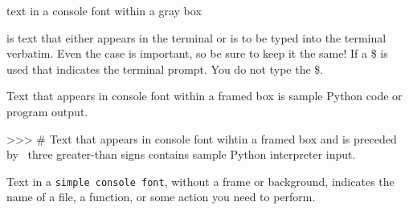 \documentclass[11pt]{cselabheader}
\begin{document}
\begin{bashcode}
text in a console font within a gray box
\end{bashcode}

is text that either appears in the terminal or is to be typed into the terminal
verbatim. Even the case is important, so be sure to keep it the same! If a \$ is
used that indicates the terminal prompt. You do not type the \$.

\begin{python3code}
Text that appears in console font within a framed box is sample Python code
or program output.
\end{python3code}

\begin{pyconcode}
>>> # Text that appears in console font wihtin a framed box and is preceded by \
three greater-than signs contains sample Python interpreter input.
\end{pyconcode}

Text in a \texttt{simple console font}, without a frame or background, indicates
the name of a file, a function, or some action you need to perform.



\end{document}
